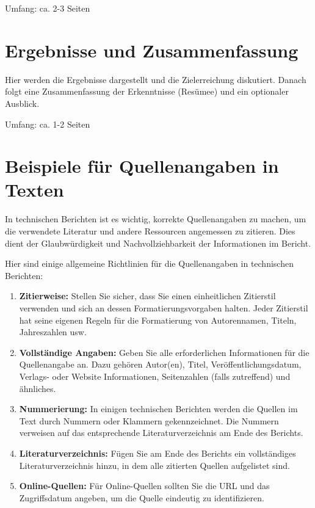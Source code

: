\documentclass[praktikum,german]{hgbthesis}
\begin{document}
\vskip 8mm
Umfang: ca. 2-3 Seiten 
\color{black}

   
\chapter{Ergebnisse und Zusammenfassung}
\color{blue}
Hier werden die Ergebnisse dargestellt und die Zielerreichung diskutiert. Danach folgt eine Zusammenfassung der Erkenntnisse (Resümee) und ein optionaler Ausblick.

\vskip 8mm
Umfang: ca. 1-2 Seiten


\newpage
\appendix                                                             %
\chapter{Beispiele für Quellenangaben in Texten}

In technischen Berichten ist es wichtig, korrekte Quellenangaben zu machen, um die verwendete Literatur und andere Ressourcen angemessen zu zitieren. Dies dient der Glaubwürdigkeit und Nachvollziehbarkeit der Informationen im Bericht.


\noindent Hier sind einige allgemeine Richtlinien für die Quellenangaben in technischen Berichten:\\

\begin{enumerate}
	\item \textbf{Zitierweise:} Stellen Sie sicher, dass Sie einen einheitlichen Zitierstil verwenden und sich an dessen Formatierungsvorgaben halten. Jeder Zitierstil hat seine eigenen
				Regeln für die Formatierung von Autorennamen, Titeln, Jahreszahlen usw.
	\item \textbf{Vollständige Angaben:} Geben Sie alle erforderlichen Informationen für die Quellenangabe an. Dazu gehören Autor(en), Titel, Veröffentlichungsdatum, Verlags- oder Website
				Informationen, Seitenzahlen (falls zutreffend) und ähnliches.
	\item \textbf{Nummerierung:} In einigen technischen Berichten werden die Quellen im Text durch Nummern oder Klammern gekennzeichnet. Die Nummern verweisen auf das entsprechende
				Literaturverzeichnis am Ende des Berichts.
	\item \textbf{Literaturverzeichnis:} Fügen Sie am Ende des Berichts ein vollständiges Literaturverzeichnis hinzu, in dem alle zitierten Quellen aufgelistet sind.
	\item \textbf{Online-Quellen:} Für Online-Quellen sollten Sie die URL und das Zugriffsdatum angeben, um die Quelle eindeutig zu identifizieren.
\end{enumerate}
\end{document}
